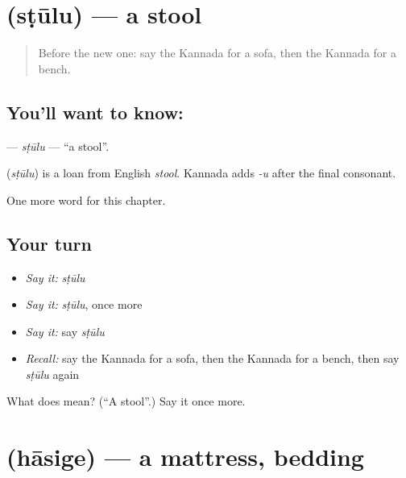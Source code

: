 \section[\texorpdfstring{\kn{ಸ್ಟೂಲು} (sṭūlu)}{ಸ್ಟೂಲು (sṭūlu)}]{ (sṭūlu) — a stool}

\label{lesson:KA-C190-stulu}



\begin{quote}
Before the new one: say the Kannada for a sofa, then the Kannada for a bench.
\end{quote}

\subsection*{You'll want to know: }
\textbf{} — \emph{sṭūlu} — \textquotedblleft{}a stool\textquotedblright{}.

\begin{cousinweb}
\textbf{} (\emph{sṭūlu}) is a loan from English \emph{stool}. Kannada adds \emph{-u} after the final consonant.
\end{cousinweb}

\begin{grammarlens}[title={What you've built}]
One more word for this chapter.
\end{grammarlens}

\subsection*{Your turn}
\begin{itemize}
\raggedright
  \item \emph{Say it:} \emph{sṭūlu}
  \item \emph{Say it:} \emph{sṭūlu}, once more
  \item \emph{Say it:} say \emph{sṭūlu}
  \item \emph{Recall:} say the Kannada for a sofa, then the Kannada for a bench, then say \emph{sṭūlu} again
\end{itemize}

\begin{tcolorbox}[breakable,colback=teal!4,colframe=teal!35!black,title={Before you move on}]
What does  mean? (\textquotedblleft{}A stool\textquotedblright{}.) Say it once more.
\end{tcolorbox}
\section[\texorpdfstring{\kn{ಹಾಸಿಗೆ} (hāsige)}{ಹಾಸಿಗೆ (hāsige)}]{ (hāsige) — a mattress, bedding}

